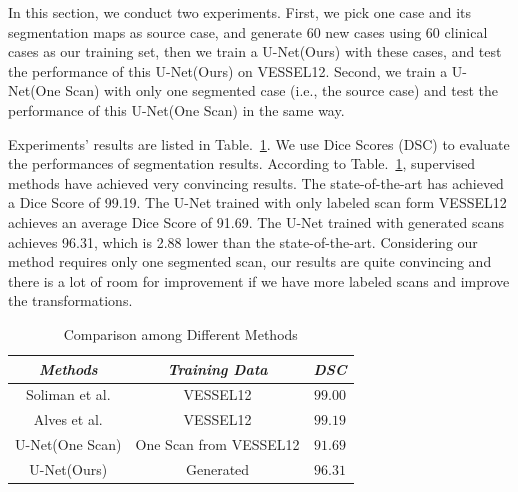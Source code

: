 \documentclass{article}
\begin{document}
In this section, we conduct two experiments.
First, we pick one case and its segmentation maps as source case, and generate 60 new cases using 60 clinical cases as our training set, then we train a U-Net(Ours) with these cases, and test the performance of this U-Net(Ours) on VESSEL12.
Second, we train a U-Net(One Scan) with only one segmented case (i.e., the source case) and test the performance of this U-Net(One Scan) in the same way. 

Experiments' results are listed in Table.~\ref{vesselres}. We use Dice Scores (DSC) \cite{dice1945measures} to evaluate the performances of segmentation results. According to Table.~\ref{vesselres}, supervised methods have achieved very convincing results. The state-of-the-art has achieved a Dice Score of 99.19. The U-Net trained with only labeled scan form VESSEL12 achieves an average Dice Score of 91.69. The U-Net trained with generated scans achieves 96.31, which is 2.88 lower than the state-of-the-art. Considering our method requires only one segmented scan, our results are quite convincing and there is a lot of room for improvement if we have more labeled scans and improve the transformations.

\begin{table}[htbp]
    \vspace{-0.5cm}
    
    \caption{Comparison among Different Methods}
    \begin{center}
    \begin{tabular}{c|c|c}

    \hline
    \textbf{\textit{Methods}} & \textbf{\textit{Training Data}}& \textbf{\textit{DSC}}\\
    \hline
    Soliman et al. \cite{soliman2016accurate} & VESSEL12 & $99.00$ \\
    Alves et al. \cite{alves2018extracting} & VESSEL12 & $99.19$ \\
    \hline
    U-Net(One Scan) & One Scan from VESSEL12 & $91.69$ \\
    U-Net(Ours) & Generated & $96.31$ \\
    \hline

    \end{tabular}
    \end{center}

    \vspace{-0.3cm}
    \label{vesselres}
    \end{table}
\end{document}
